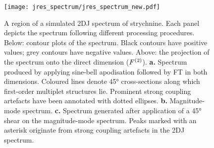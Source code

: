 \begin{figure}
    \texttt{[image: jres\_spectrum/jres\_spectrum\_new.pdf]}%
    \caption[
        A region of a \acs{2DJ} spectrum of strychnine, processed in different
        ways.
    ]
    {%
        A region of a simulated \acs{2DJ} spectrum of strychnine.
        Each panel depicts the spectrum following different processing
        procedures. Below: contour plots of the spectrum.
        Black contours have positive values; grey contours have negative
        values.
        Above: the projection of the spectrum onto the direct dimension ($F^{(2)}$).
        \textbf{a.} Spectrum produced by applying sine-bell apodisation
        followed by \ac{FT} in both dimensions.
        Coloured lines denote \ang{45} cross-sections along which first-order
        multiplet structures lie.
        Prominent strong coupling artefacts have been annotated with dotted
        ellipses.
        \textbf{b.} Magnitude-mode spectrum.
        \textbf{c.} Spectrum generated after application of a \ang{45} shear on
        the magnitude-mode spectrum. Peaks marked with an asterisk originate
        from strong coupling artefacts in the \ac{2DJ} spectrum.
   }%
    \label{fig:jres-spectrum}%
    \end{figure}

